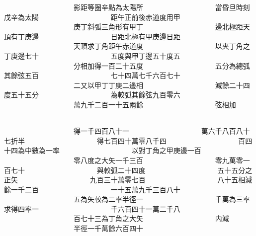 \begin{正文}
　　　　　　　　　　影距等圈辛點為太陽所
　　　　　　　　　　當昏旦時刻戊辛為太陽
　　　　　　　　　　距午正前後赤道度用甲
　　　　　　　　　　庚丁斜弧三角形有甲丁
　　　　　　　　　　邊北極距天頂有丁庚邊
　　　　　　　　　　日距北極有甲庚邊日距
　　　　　　　　　　天頂求丁角距午赤道度
　　　　　　　　　　以夾丁角之丁庚邊七十
　　　　　　　　　　五度與甲丁邊五十度五
　　　　　　　　　　分相加得一百二十五度
　　　　　　　　　　五分為總弧其餘弦五百
　　　　　　　　　　七十四萬七千六百七十
　　　　　　　　　　二又以甲丁丁庚二邊相
　　　　　　　　　　減餘二十四度五十五分
　　　　　　　　　　為較弧其餘弦九百零六
　　　　　　　　　　萬九千二百一十五兩餘
　　　　　　　　　　弦相加
\par
\end{正文}\clearpage
{}
\begin{正文}
　　　　　　　　　　得一千四百八十一
　　　　　　　　　　萬六千八百八十七折半
　　　　　　　　　　得七百四十萬零八千四
　　　　　　　　　　百四十四為中數為一率
　　　　　　　　　　以對丁角之甲庚邊一百
　　　　　　　　　　零八度之大矢一千三百
　　　　　　　　　　零九萬零一百七十
　　　　　　　　　　與較弧二十四度
　　　　　　　　　　五十五分之正矢
　　　　　　　　　　九百三十萬零七百
　　　　　　　　　　八十五相減餘一千二百
　　　　　　　　　　一十五萬九千三百八十
　　　　　　　　　　五為矢較為二率半徑一
　　　　　　　　　　千萬為三率求得四率一
　　　　　　　　　　千六百四十一萬二千八
　　　　　　　　　　百七十三為丁角之大矢
　　　　　　　　　　内減
　　　　　　　　　　半徑一千萬餘六百四十
\par
\end{正文}\clearpage
{}
